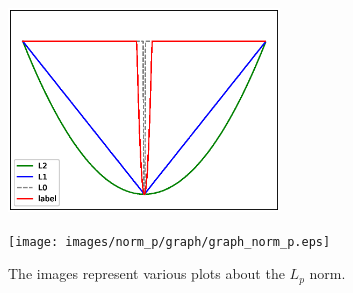 \begin{figure}[htbp]
\vspace{-15pt}
	\begin{minipage}[b]{0.5\hsize}
		\centering
		\includegraphics[width=72mm, height = 54mm]{images/norm_p/graph/graph_norm.eps}
		 \label{fig:nom_p/comparison}
	\end{minipage}
	\begin{minipage}[b]{0.5\hsize}
		\centering
		\texttt{[image: images/norm\_p/graph/graph\_norm\_p.eps]}
		 \label{fig:nom_p/graph_norm_p}
	\end{minipage}
	\caption{The images represent various plots about the $L_{p}$ norm.}
	\label{fig:graph_lp}
\end{figure}

